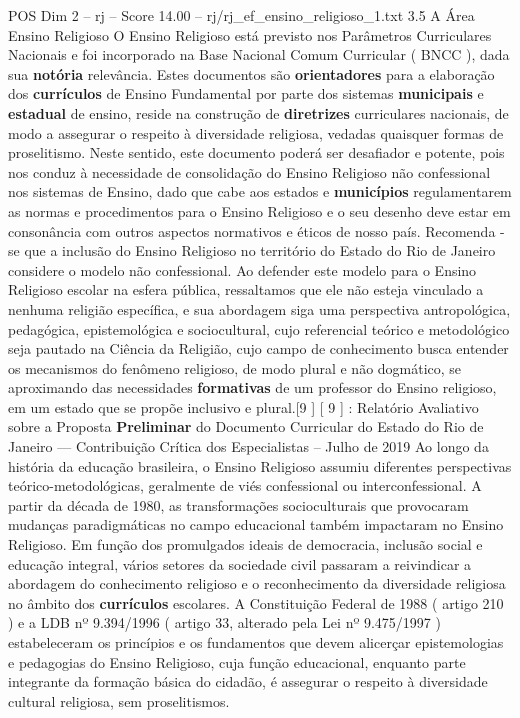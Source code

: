 \begin{textsample}{POS Dim 2 – rj – Score 14.00 – rj/rj\_ef\_ensino\_religioso\_1.txt}  \label{ex:f2_pos_238}
3.5 A Área Ensino Religioso O Ensino Religioso está previsto nos Parâmetros Curriculares Nacionais e foi incorporado na Base Nacional Comum Curricular ( BNCC ), dada sua \textbf{notória} relevância.
Estes documentos são \textbf{orientadores} para a elaboração dos \textbf{currículos} de Ensino Fundamental por parte dos sistemas \textbf{municipais} e \textbf{estadual} de ensino, reside na construção de \textbf{diretrizes} curriculares nacionais, de modo a assegurar o respeito à diversidade religiosa, vedadas quaisquer formas de proselitismo.
Neste sentido, este documento poderá ser desafiador e potente, pois nos conduz à necessidade de consolidação do Ensino Religioso não confessional nos sistemas de Ensino, dado que cabe aos estados e \textbf{municípios} regulamentarem as normas e procedimentos para o Ensino Religioso e o seu desenho deve estar em consonância com outros aspectos normativos e éticos de nosso país.
Recomenda -se que a inclusão do Ensino Religioso no território do Estado do Rio de Janeiro considere o modelo não confessional.
Ao defender este modelo para o Ensino Religioso escolar na esfera pública, ressaltamos que ele não esteja vinculado a nenhuma religião específica, e sua abordagem siga uma perspectiva antropológica, pedagógica, epistemológica e sociocultural, cujo referencial teórico e metodológico seja pautado na Ciência da Religião, cujo campo de conhecimento busca entender os mecanismos do fenômeno religioso, de modo plural e não dogmático, se aproximando das necessidades \textbf{formativas} de um professor do Ensino religioso, em um estado que se propõe inclusivo e plural.[9 ] [ 9 ] : Relatório Avaliativo sobre a Proposta \textbf{Preliminar} do Documento Curricular do Estado do Rio de Janeiro — Contribuição Crítica dos Especialistas – Julho de 2019 Ao longo da história da educação brasileira, o Ensino Religioso assumiu diferentes perspectivas teórico-metodológicas, geralmente de viés confessional ou interconfessional.
A partir da década de 1980, as transformações socioculturais que provocaram mudanças paradigmáticas no campo educacional também impactaram no Ensino Religioso.
Em função dos promulgados ideais de democracia, inclusão social e educação integral, vários setores da sociedade civil passaram a reivindicar a abordagem do conhecimento religioso e o reconhecimento da diversidade religiosa no âmbito dos \textbf{currículos} escolares.
A Constituição Federal de 1988 ( artigo 210 ) e a LDB nº 9.394/1996 ( artigo 33, alterado pela Lei nº 9.475/1997 ) estabeleceram os princípios e os fundamentos que devem alicerçar epistemologias e pedagogias do Ensino Religioso, cuja função educacional, enquanto parte integrante da formação básica do cidadão, é assegurar o respeito à diversidade cultural religiosa, sem proselitismos.

\end{textsample}

